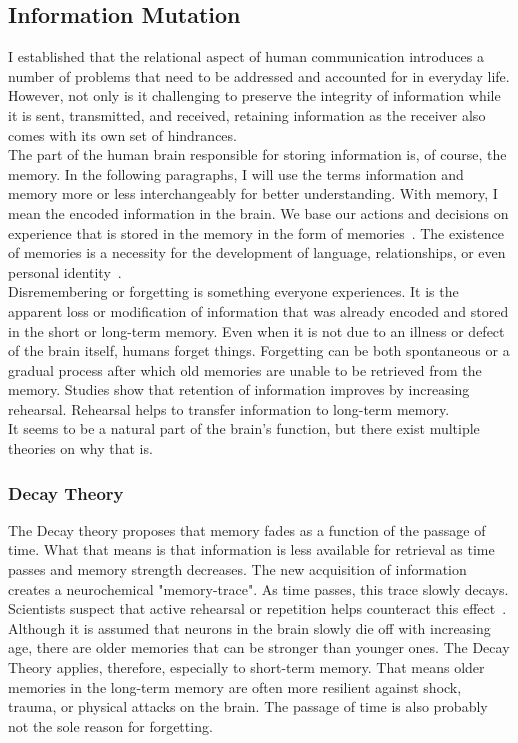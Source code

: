 \subsection{Information Mutation}
I established that the relational aspect of human communication introduces a number of problems that need to be addressed and accounted for in everyday life. However, not only is it challenging to preserve the integrity of information while it is sent, transmitted, and received, retaining information as the receiver also comes with its own set of hindrances.\\
The part of the human brain responsible for storing information is, of course, the memory. In the following paragraphs, I will use the terms information and memory more or less interchangeably for better understanding. With memory, I mean the encoded information in the brain. We base our actions and decisions on experience that is stored in the memory in the form of memories~\cite{Sherwood2015}. The existence of memories is a necessity for the development of language, relationships, or even personal identity~\cite{Eysenck2012}.\\
Disremembering or forgetting is something everyone experiences. It is the apparent loss or modification of information that was already encoded and stored in the short or long-term memory. Even when it is not due to an illness or defect of the brain itself, humans forget things. Forgetting can be both spontaneous or a gradual process after which old memories are unable to be retrieved from the memory. Studies show that retention of information improves by increasing rehearsal. Rehearsal helps to transfer information to long-term memory.~\cite{Weiten2021}\\
It seems to be a natural part of the brain's function, but there exist multiple theories on why that is.
\subsubsection{Decay Theory}
The Decay theory proposes that memory fades as a function of the passage of time. What that means is that information is less available for retrieval as time passes and memory strength decreases. The new acquisition of information creates a neurochemical "memory-trace". As time passes, this trace slowly decays. Scientists suspect that active rehearsal or repetition helps counteract this effect~\cite{Oberauer2008}. Although it is assumed that neurons in the brain slowly die off with increasing age, there are older memories that can be stronger than younger ones. The Decay Theory applies, therefore, especially to short-term memory. That means older memories in the long-term memory are often more resilient against shock, trauma, or physical attacks on the brain. The passage of time is also probably not the sole reason for forgetting.~\cite{Berman2009}
